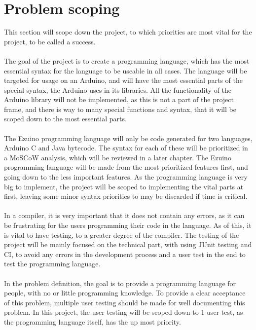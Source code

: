 \section{Problem scoping}
This section will scope down the project, to which priorities are most vital for the project, to be called a success. \\
\\
The goal of the project is to create a programming language, which has the most essential syntax for the language to be useable in all cases. The language will be targeted for usage on an Arduino, and will have the most essential parts of the special syntax, the Arduino uses in its libraries. All the functionality of the Arduino library will not be implemented, as this is not a part of the project frame, and there is way to many special functions and syntax, that it will be scoped down to the most essential parts. \\
\\
The Ezuino programming language will only be code generated for two languages, Arduino C and Java bytecode. The syntax for each of these will be prioritized in a MoSCoW analysis, which will be reviewed in a later chapter. The Ezuino programming language will be made from the most prioritized features first, and going down to the less important features. As the programming language is very big to implement, the project will be scoped to implementing the vital parts at first, leaving some minor syntax priorities to may be discarded if time is critical. \\
\\
In a compiler, it is very important that it does not contain any errors, as it can be frustrating for the users programming their code in the language. As of this, it is vital to have testing, to a greater degree of the compiler. The testing of the project will be mainly focused on the technical part, with using JUnit testing and CI, to avoid any errors in the development process and a user test in the end to test the programming language. \\
\\ 
In the problem definition, the goal is to provide a programming language for people, with no or little programming knowledge. To provide a clear acceptance of this problem, multiple user testing should be made for well documenting this problem. In this project, the user testing will be scoped down to 1 user test, as the programming language itself, has the up most priority.

